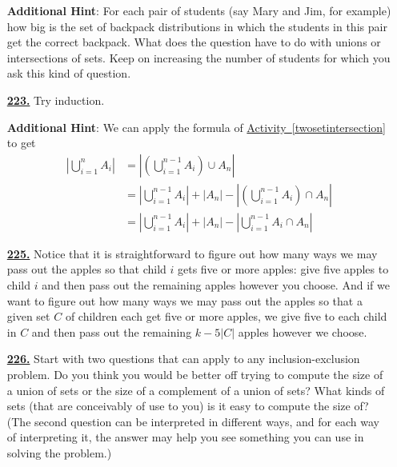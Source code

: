 \documentclass[10pt,]{book}
\theoremstyle{plain}
\theoremstyle{definition}
\theoremstyle{definition}
\theoremstyle{definition}
\numberwithin{equation}{chapter}
\newcommand{\amp}{&}
\begin{document}
\begin{itemize}[itemsep=1em]
\par\smallskip
\noindent\textbf{Additional Hint}: \hypertarget{p-1188}{}%
For each pair of students (say Mary and Jim, for example) how big is the set of backpack distributions in which the students in this pair get the correct backpack. What does the question have to do with unions or intersections of sets. Keep on increasing the number of students for which you ask this kind of question.%

\hypertarget{a-223}{}\item[\textbf{\hyperref[activity-216]{223.}}]
\hypertarget{p-1199}{}%
Try induction.%

\par\smallskip
\noindent\textbf{Additional Hint}: \hypertarget{p-1200}{}%
We can apply the formula of \hyperref[twosetintersection]{Activity~\ref{twosetintersection}} to get%
\begin{align*}
\left|\bigcup_{i=1}^n A_i \right| \amp = \left|\left(\bigcup_{i=1}^{n-1} A_i\right) \cup A_n \right| \\
\amp = \left| \bigcup_{i=1}^{n-1} A_i\right| + |A_n| - \left|\left( \bigcup_{i=1}^{n-1} A_i\right) \cap A_n\right|\\
\amp = \left| \bigcup_{i=1}^{n-1} A_i\right| + |A_n| - \left|\bigcup_{i=1}^{n-1} A_i \cap A_n\right|
\end{align*}
%

\hypertarget{a-225}{}\item[\textbf{\hyperref[act_restrictedmultisetspie]{225.}}]
\hypertarget{p-1206}{}%
Notice that it is straightforward to figure out how many ways we may pass out the apples so that child \(i\) gets five or more apples: give five apples to child \(i\) and then pass out the remaining apples however you choose. And if  we want to figure out how many ways we may pass out the apples so that a given set \(C\) of children each get five or more apples, we give five to each child in \(C\) and then pass out the remaining \(k-5|C|\) apples however we choose.%

\hypertarget{a-226}{}\item[\textbf{\hyperref[relaxedmenage]{226.}}]
\hypertarget{p-1209}{}%
Start with two questions that can apply to any inclusion-exclusion problem. Do you think you would be better off trying to compute the size of a union of sets or the size of a complement of a union of sets? What kinds of sets (that are conceivably of use to you) is it easy to compute the size of? (The second question can be interpreted in different ways, and for each way of interpreting it, the answer may help you see something you can use in solving the problem.)%


\end{itemize}
\end{document}
